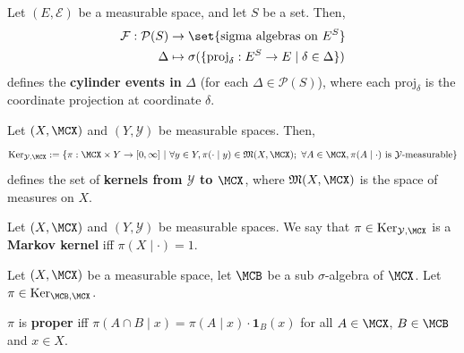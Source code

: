 \begin{definition}
    \label{def:cylinder-event}
    \leanok{}

    Let $(E,\mathcal{E})$ be a measurable space, and let $S$ be a set. Then,
    \begin{align}
        \mathcal{F}:\mathcal{P}(S)&\to \set{\text{sigma algebras on } E^S}\\
        \Delta&\mapsto \sigma(\{\text{proj}_\delta:E^S\to E\mid \delta\in \Delta\})
    \end{align}
    defines the \textbf{cylinder events in }$\Delta$ (for each $\Delta\in\mathcal{P}(S)$),
    where each $\text{proj}_\delta$ is the coordinate projection at coordinate $\delta$.
\end{definition}

\begin{definition}[Kernel]
    \label{def:kernel}
    \leanok{}

    Let $(X,\MCX)$ and $(Y,\mathcal{Y})$ be measurable spaces. Then,
    \[\text{Ker}_{\mathcal{Y},\MCX}:=\left\{\pi:\MCX\times Y\to[0,\infty]~\middle\vert~ \forall y\in Y,\pi(\cdot\mid y)\in\mathfrak{M}(X,\MCX);~\forall A\in\MCX,\pi(A\mid\cdot)\text{ is }\mathcal{Y}\text{-measurable}\right\}\]
    defines the set of \textbf{kernels from $\mathcal{Y}$ to $\MCX$}, where $\mathfrak{M}(X,\MCX)$ is the space of measures on $X$.
\end{definition}

\begin{definition}
    \label{def:markov-ker}
    \leanok{}

    Let $(X,\MCX)$ and $(Y,\mathcal{Y})$ be measurable spaces. We say that $\pi\in\text{Ker}_{\mathcal{Y},\MCX}$ is a \textbf{Markov kernel} iff $\pi(X\mid \cdot)=1$.
\end{definition}

Let $(X, \MCX)$ be a measurable space, let $\MCB$ be a sub $\sigma$-algebra of $\MCX$. Let $\pi \in \text{Ker}_{\MCB, \MCX}$.

\begin{definition}
    \label{def:proper-ker}
    \leanok{}

    $\pi$ is \textbf{proper} iff $\pi(A\cap B\mid x)=\pi(A\mid x)\cdot\mathbf{1}_B(x)$ for all $A\in\MCX$, $B\in\MCB$ and $x\in X$.
\end{definition}

